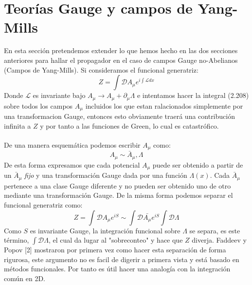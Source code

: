 \section{Teorías Gauge y campos de Yang-Mills}
En esta sección pretendemos extender lo que hemos hecho en las dos secciones anteriores para hallar el propagador en el caso de campos Gauge no-Abelianos (Campos de Yang-Mills). Si consideramos el funcional generatriz:
\begin{equation}
Z=\int\mathcal{D}A_{\mu}e^{i\int\mathcal{L}dx}
\end{equation}
Donde $\mathcal{L}$ es invariante bajo $A_\mu \to A_\mu+\partial_\mu\Lambda$ e intentamos hacer la integral (2.208) sobre todos los campos $A_\mu$ incluidos los que estan ralacionados simplemente por una transformacion Gauge, entonces esto obviamente traerá una contribución infinita a $Z$ y por tanto a las funciones de Green, lo cual es catastrófico.
\\
\\
De una manera esquemática podemos escribir $A_\mu$ como:
\begin{equation}
A_\mu\sim \bar{A}_\mu, \Lambda
\end{equation}
De esta forma expresamos que cada potencial $A_\mu$ puede ser obtenido a partir de un $\bar{A}_\mu$ \textit{fijo} y una transformación Gauge dada por una función $\Lambda(x)$. Cada $\bar{A}_\mu$ pertenece a una clase Gauge diferente y no pueden ser obtenido uno de otro mediante una transformación Gauge. De la misma forma podemos separar el funcional generatriz como:
\begin{equation}
Z=\int\mathcal{D}A_{\mu}e^{iS}\sim\int\mathcal{D}\bar{A_{\mu}}e^{iS}\int\mathcal{D}\Lambda
\end{equation}  	  	
Como $S$ es invariante Gauge, la integración funcional sobre $\Lambda$ se separa, es este término, $\int \mathcal{D}\Lambda$, el cual da lugar al "sobreconteo" y hace que $Z$ diverja. Faddeev y Popov [2] mostraron por primera vez como hacer esta separación de forma rigurosa, este argumento no es facil de digerir a primera vista y está basado en métodos funcionales. Por tanto es útil hacer una analogía con la integración común en 2D.
 		



